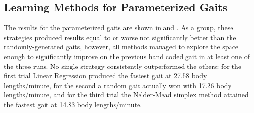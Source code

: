 


\subsection{Learning Methods for Parameterized Gaits}


The results for the parameterized gaits are shown in
 and .  As a group, these strategies
produced results equal to or worse not significantly better than the randomly-generated
gaits, however, all methods managed to explore the space enough to
significantly improve on the previous hand coded gait in at least one
of the three runs.  No single strategy consistently outperformed the
others: for the first trial Linear Regression produced the fastest
gait at 27.58 body lengths/minute, for the second a random gait
actually won with 17.26 body lengths/minute, and for the third trial
the Nelder-Mead simplex method attained the fastest gait at 14.83 body
lengths/minute.



% 
% 
% 


